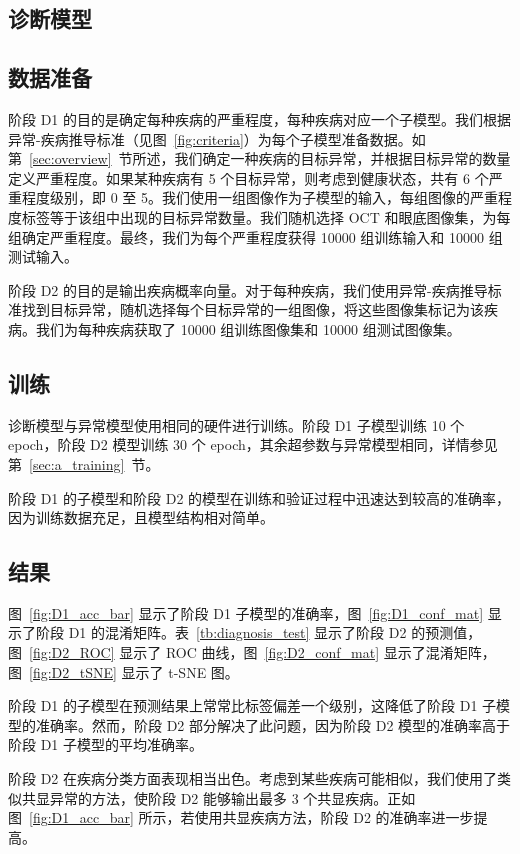 \documentclass{article}
\begin{document}
	\begin{multicols}{2}
	\section{诊断模型}
	
	\subsection{数据准备}
	
	阶段 D1 的目的是确定每种疾病的严重程度，每种疾病对应一个子模型。我们根据异常-疾病推导标准（见图~\ref{fig:criteria}）为每个子模型准备数据。如第~\ref{sec:overview}~节所述，我们确定一种疾病的目标异常，并根据目标异常的数量定义严重程度。如果某种疾病有 5 个目标异常，则考虑到健康状态，共有 6 个严重程度级别，即 0 至 5。我们使用一组图像作为子模型的输入，每组图像的严重程度标签等于该组中出现的目标异常数量。我们随机选择 OCT 和眼底图像集，为每组确定严重程度。最终，我们为每个严重程度获得 10000 组训练输入和 10000 组测试输入。
	
	阶段 D2 的目的是输出疾病概率向量。对于每种疾病，我们使用异常-疾病推导标准找到目标异常，随机选择每个目标异常的一组图像，将这些图像集标记为该疾病。我们为每种疾病获取了 10000 组训练图像集和 10000 组测试图像集。
	
	\subsection{训练}
	
	诊断模型与异常模型使用相同的硬件进行训练。阶段 D1 子模型训练 10 个 epoch，阶段 D2 模型训练 30 个 epoch，其余超参数与异常模型相同，详情参见第~\ref{sec:a_training}~节。
	
	阶段 D1 的子模型和阶段 D2 的模型在训练和验证过程中迅速达到较高的准确率，因为训练数据充足，且模型结构相对简单。
	
	
	\subsection{结果}
	
	图~\ref{fig:D1_acc_bar} 显示了阶段 D1 子模型的准确率，图~\ref{fig:D1_conf_mat} 显示了阶段 D1 的混淆矩阵。表~\ref{tb:diagnosis_test} 显示了阶段 D2 的预测值，图~\ref{fig:D2_ROC} 显示了 ROC 曲线，图~\ref{fig:D2_conf_mat} 显示了混淆矩阵，图~\ref{fig:D2_tSNE} 显示了 t-SNE 图。
	
	阶段 D1 的子模型在预测结果上常常比标签偏差一个级别，这降低了阶段 D1 子模型的准确率。然而，阶段 D2 部分解决了此问题，因为阶段 D2 模型的准确率高于阶段 D1 子模型的平均准确率。
	
	阶段 D2 在疾病分类方面表现相当出色。考虑到某些疾病可能相似，我们使用了类似共显异常的方法，使阶段 D2 能够输出最多 3 个共显疾病。正如图~\ref{fig:D1_acc_bar} 所示，若使用共显疾病方法，阶段 D2 的准确率进一步提高。
	\end{multicols}
	
\end{document}

